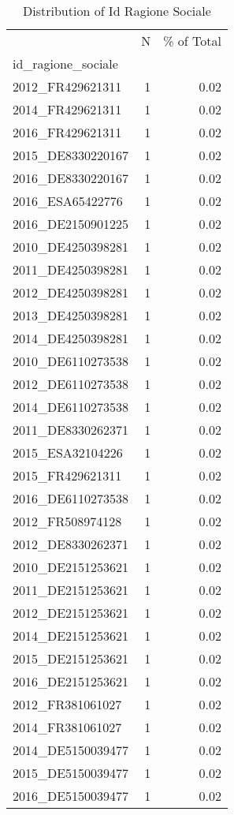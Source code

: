 \begin{table*}[htbp]
\centering
\small
\caption{Distribution of Id Ragione Sociale}
\label{tab:dist_id_ragione_sociale}
\begin{tabular}{lrr}
\toprule
 & N & \% of Total \\
id_ragione_sociale &  &  \\
\midrule
2012_FR429621311 & 1 & 0.02 \\
2014_FR429621311 & 1 & 0.02 \\
2016_FR429621311 & 1 & 0.02 \\
2015_DE8330220167 & 1 & 0.02 \\
2016_DE8330220167 & 1 & 0.02 \\
2016_ESA65422776 & 1 & 0.02 \\
2016_DE2150901225 & 1 & 0.02 \\
2010_DE4250398281 & 1 & 0.02 \\
2011_DE4250398281 & 1 & 0.02 \\
2012_DE4250398281 & 1 & 0.02 \\
2013_DE4250398281 & 1 & 0.02 \\
2014_DE4250398281 & 1 & 0.02 \\
2010_DE6110273538 & 1 & 0.02 \\
2012_DE6110273538 & 1 & 0.02 \\
2014_DE6110273538 & 1 & 0.02 \\
2011_DE8330262371 & 1 & 0.02 \\
2015_ESA32104226 & 1 & 0.02 \\
2015_FR429621311 & 1 & 0.02 \\
2016_DE6110273538 & 1 & 0.02 \\
2012_FR508974128 & 1 & 0.02 \\
2012_DE8330262371 & 1 & 0.02 \\
2010_DE2151253621 & 1 & 0.02 \\
2011_DE2151253621 & 1 & 0.02 \\
2012_DE2151253621 & 1 & 0.02 \\
2014_DE2151253621 & 1 & 0.02 \\
2015_DE2151253621 & 1 & 0.02 \\
2016_DE2151253621 & 1 & 0.02 \\
2012_FR381061027 & 1 & 0.02 \\
2014_FR381061027 & 1 & 0.02 \\
2014_DE5150039477 & 1 & 0.02 \\
2015_DE5150039477 & 1 & 0.02 \\
2016_DE5150039477 & 1 & 0.02 \\

\end{tabular}
\end{table*}
